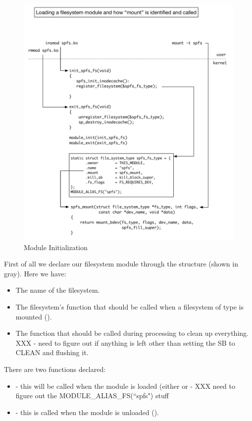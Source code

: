\begin{figure}
	\includegraphics[scale=0.45]{figures/module-load.pdf}
	\centering
	\caption{Module Initialization}
	\label{fig:module-load}
\end{figure}

First of all we declare our filesystem module through the  structure (shown in gray). Here we have:

\begin{itemize}
	\item The name of the filesystem.
	\item The filesystem’s  function that should be called when a filesystem of type  
	         is mounted ().
	\item The function that should be called during  processing to clean up everything. 
		XXX - need to figure out if anything is left other than setting the SB to CLEAN and flushing it.
\end{itemize}

\noindent
There are two functions declared:

\begin{itemize}
	\item {} - this will be called when the module is loaded (either 
		 or  - XXX need to figure out the MODULE\_ALIAS\_FS(“spfs") stuff
	\item {} - this is called when the module is unloaded ().
\end{itemize}

